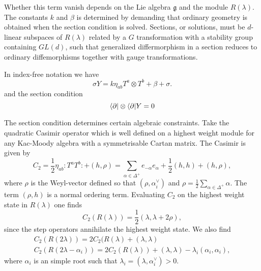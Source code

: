\documentclass{article}
\begin{document}
Whether this term vanish depends on the Lie algebra $\mathfrak{g}$ and the module $R(\lambda)$. The constants $k$ and $\beta$ is determined by demanding that ordinary geometry is obtained when the section condition is solved. Sections, or solutions, must be $d$-linear subspaces of $R(\lambda)$ related by a $G$ transformation with a stability group containing $GL(d)$, such that generalized differmorphism in a section reduces to ordinary diffemorphisms together with gauge transformations. 

In index-free notation we have
\begin{equation}
    \sigma Y = k\eta_{ab}T^a\otimes T^b + \beta+\sigma.
\end{equation}
and the section condition 
\begin{equation}
    \langle \partial |\otimes \langle\partial| Y = 0
\end{equation}


The section condition determines certain algebraic constraints. Take the quadratic Casimir operator which is well defined on a highest weight module for any Kac-Moody algebra with a symmetrisable Cartan matrix. The Casimir is given by 
\begin{equation}
    C_2 = \frac{1}{2}\eta_{ab}:T^{a}T^b:+(h,\rho) = \sum_{\alpha\in\Delta^+}e_{-\alpha}e_\alpha +\frac{1}{2}(h,h)+(h,\rho),
\end{equation}
where $\rho$ is the Weyl-vector defined so that $(\rho,\alpha_i^\vee)$ and $\rho = \frac{1}{2}\sum_{\alpha\in\Delta^+}\alpha$. The term $(\rho,h)$ is a normal ordering term. Evaluating $C_2$ on the highest weight state in $R(\lambda)$ one finds 
\begin{equation}
    C_2(R(\lambda)) = \frac{1}{2}(\lambda,\lambda+2\rho),
\end{equation}
since the step operators annihilate the highest weight state. We also find 
\begin{align*}
    C_2(R(2\lambda)) = 2C_2(R(\lambda)+(\lambda,\lambda)\\
    C_2(R(2\lambda-\alpha_i)) = 2C_2(R(\lambda))+(\lambda,\lambda)-\lambda_i(\alpha_i,\alpha_i),
\end{align*}
where $\alpha_i$ is an simple root such that $\lambda_i = (\lambda,\alpha_i^\vee)>0$. 
\end{document}
